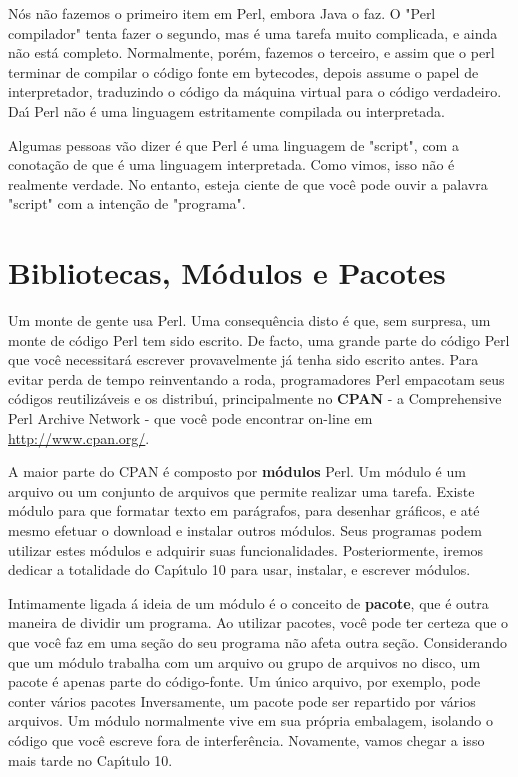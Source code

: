 \documentclass[a4paper,12pt,twoside]{book}
\begin{document}
\noindent N\'os n\~ao fazemos o primeiro item em Perl, embora Java o faz. O "Perl compilador" 
tenta fazer o segundo, mas \'e uma tarefa muito complicada, e ainda n\~ao est\'a completo. 
Normalmente, por\'em, fazemos o terceiro, e assim que o perl terminar de compilar o c\'odigo 
fonte em bytecodes, depois assume o papel de interpretador, traduzindo o c\'odigo da m\'aquina 
virtual para o c\'odigo verdadeiro. Da\'{\i} Perl n\~ao \'e uma linguagem estritamente 
compilada ou interpretada.\medskip

\noindent Algumas pessoas v\~ao dizer \'e que Perl \'e uma linguagem de "script", com a 
conota\c{c}\~ao de que \'e uma linguagem interpretada. Como vimos, isso n\~ao \'e realmente 
verdade. No entanto, esteja ciente de que voc\^e pode ouvir a palavra "script" com a inten\c{c}\~ao 
de "programa".

\section{Bibliotecas, M\'odulos e Pacotes}

\noindent Um monte de gente usa Perl. Uma consequ\^encia disto \'e que, sem surpresa, um monte de 
c\'odigo Perl tem sido escrito. De facto, uma grande parte do c\'odigo Perl que voc\^e necessitar\'a 
escrever provavelmente j\'a tenha sido escrito antes. Para evitar perda de tempo reinventando a roda, 
programadores Perl empacotam seus c\'odigos reutiliz\'aveis e os distribu\'{\i}, principalmente no 
\textbf{CPAN} - a Comprehensive Perl Archive Network - que voc\^e pode encontrar on-line em 
\url{http://www.cpan.org/}.\medskip

\noindent A maior parte do CPAN \'e composto por \textbf{m\'odulos} Perl. Um m\'odulo \'e um 
arquivo ou um conjunto de arquivos que permite realizar uma tarefa. Existe m\'odulo para que 
formatar texto em par\'agrafos, para desenhar gr\'aficos, e at\'e mesmo efetuar o download e 
instalar outros m\'odulos. Seus programas podem utilizar estes m\'odulos e adquirir suas 
funcionalidades. Posteriormente, iremos dedicar a totalidade do Cap\'{\i}tulo 10 para usar, 
instalar, e escrever m\'odulos.\medskip

\noindent Intimamente ligada \'a ideia de um m\'odulo \'e o conceito de \textbf{pacote}, 
que \'e outra maneira de dividir um programa. Ao utilizar pacotes, voc\^e pode ter certeza 
que o que voc\^e faz em uma se\c{c}\~ao do seu programa n\~ao afeta outra se\c{c}\~ao. 
Considerando que um m\'odulo trabalha com um arquivo ou grupo de arquivos no disco, um 
pacote \'e apenas parte do c\'odigo-fonte. Um \'unico arquivo, por exemplo, pode conter 
v\'arios pacotes Inversamente, um pacote pode ser repartido por v\'arios arquivos. Um 
m\'odulo normalmente vive em sua pr\'opria embalagem, isolando o c\'odigo que voc\^e 
escreve fora de interfer\^encia. Novamente, vamos chegar a isso mais tarde no Cap\'{\i}tulo 10.\medskip
\end{document}

